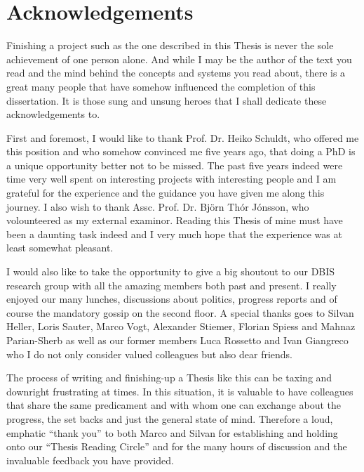 
\chapter{Acknowledgements}

Finishing a project such as the one described in this Thesis is never the sole achievement of one person alone. And while I may be the author of the text you read and the mind behind the concepts and systems you read about, there is a great many people that have somehow influenced the completion of this dissertation. It is those sung and unsung heroes that I shall dedicate these acknowledgements to.

First and foremost, I would like to thank Prof. Dr. Heiko Schuldt, who offered me this position and who somehow convinced me five years ago, that doing a PhD is a unique opportunity better not to be missed. The past five years indeed were time very well spent on interesting projects with interesting people and I am grateful for the experience and the guidance you have given me along this journey. I also wish to thank Assc. Prof. Dr. Björn Thór Jónsson, who volounteered as my external examinor. Reading this Thesis of mine must have been a daunting task indeed and I very much hope that the experience was at least somewhat pleasant.

I would also like to take the opportunity to give a big shoutout to our DBIS research group with all the amazing members both past and present. I really enjoyed our many lunches, discussions about politics, progress reports and of course the mandatory gossip on the second floor. A special thanks goes to Silvan Heller, Loris Sauter, Marco Vogt, Alexander Stiemer, Florian Spiess and Mahnaz Parian-Sherb as well as our former members Luca Rossetto and Ivan Giangreco who I do not only consider valued colleagues but also dear friends.  

The process of writing and finishing-up a Thesis like this can be taxing and downright frustrating at times. In this situation, it is valuable to have colleagues that share the same predicament and with whom one can exchange about the progress, the set backs and just the general state of mind. Therefore a loud, emphatic ``thank you'' to both Marco and Silvan for establishing and holding onto our ``Thesis Reading Circle'' and for the many hours of discussion and the invaluable feedback you have provided.

